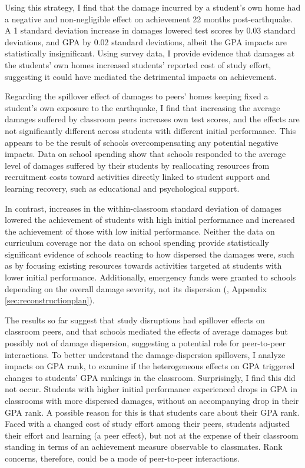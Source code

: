 Using this strategy, I find that the damage incurred by a student's own home had a negative and non-negligible effect on achievement 22 months post-earthquake. A 1 standard deviation increase in damages lowered test scores by 0.03 standard deviations, and GPA by 0.02 standard deviations, albeit the GPA impacts are statistically insignificant. Using survey data, I provide evidence that damages at the students' own homes increased students' reported cost of study effort, suggesting it could have mediated the detrimental impacts on achievement. \par
Regarding the spillover effect of damages to peers' homes keeping fixed a student's own exposure to the earthquake, I find that increasing the average damages suffered by classroom peers increases own test scores, and the effects are not significantly different across students with different initial performance. This appears to be the result of schools overcompensating any potential negative impacts. Data on school spending show that schools responded to the average level of damages suffered by their students by reallocating resources from recruitment costs toward activities directly linked to student support and learning recovery, such as educational and psychological support.\par 
In contrast, increases in the within-classroom standard deviation of damages lowered the achievement of students with high initial performance and increased the achievement of those with low initial performance. Neither the data on curriculum coverage nor the data on school spending provide statistically significant evidence of schools reacting to how dispersed the damages were, such as by focusing existing resources towards activities targeted at students with lower initial performance. Additionally, emergency funds were granted to schools depending on the overall damage severity, not its dispersion (\cite{Gobierno2010}, Appendix \ref{sec:reconstructionplan}). \par 
The results so far suggest that study disruptions had spillover effects on classroom peers, and that schools mediated the effects of average damages but possibly not of damage dispersion, suggesting a potential role for peer-to-peer interactions. To better understand the damage-dispersion spillovers, I analyze impacts on GPA rank, to examine if the heterogeneous effects on GPA triggered changes to students' GPA rankings in the classroom. Surprisingly, I find this did not occur. Students with higher initial performance experienced drops in GPA in classrooms with more dispersed damages, without an accompanying drop in their GPA rank.  A possible reason for this is that students care about their GPA rank. Faced with a changed cost of study effort among their peers, students adjusted their effort and learning (a peer effect), but not at the expense of their classroom standing in terms of an achievement measure observable to classmates. Rank concerns, therefore, could be a mode of peer-to-peer interactions.\par

